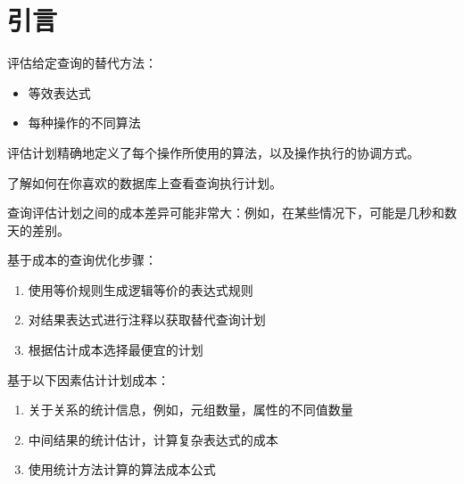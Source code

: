 \section{引言}

评估给定查询的替代方法：
\begin{itemize}
    \item 等效表达式
    \item 每种操作的不同算法
\end{itemize}

评估计划精确地定义了每个操作所使用的算法，以及操作执行的协调方式。

了解如何在你喜欢的数据库上查看查询执行计划。

查询评估计划之间的成本差异可能非常大：例如，在某些情况下，可能是几秒和数天的差别。

基于成本的查询优化步骤：
\begin{enumerate}
    \item 使用等价规则生成逻辑等价的表达式规则
    \item 对结果表达式进行注释以获取替代查询计划
    \item 根据估计成本选择最便宜的计划
\end{enumerate}

基于以下因素估计计划成本：
\begin{enumerate}
    \item 关于关系的统计信息，例如，元组数量，属性的不同值数量
    \item 中间结果的统计估计，计算复杂表达式的成本
    \item 使用统计方法计算的算法成本公式
\end{enumerate}